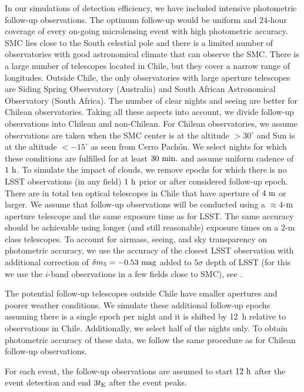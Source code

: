 \documentclass[12pt,letterpaper]{article}
\begin{document}
In our simulations of detection efficiency, 
we have included intensive photometric follow-up observations.  
The optimum follow-up would be uniform and 24-hour coverage of 
every on-going microlensing event with high photometric accuracy. 
SMC lies close to the South celestial pole and there is a limited number of 
observatories with good astronomical climate that can observe the SMC.  
There is a large number of telescopes located in Chile, but they cover a narrow 
range of longitudes.  Outside Chile, the only observatories with large aperture telescopes are 
Siding Spring Observatory (Australia) and 
South African Astronomical Observatory (South Africa).  
The number of clear nights and seeing are better for Chilean observatories.  
Taking all these aspects into account, we divide follow-up observations 
into Chilean and non-Chilean.  
For Chilean observatories, we assume observations are taken when the SMC center 
is at the altitude $>30^{\circ}$ and Sun is at the altitude $<-15^{\circ}$ 
as seen from Cerro Pach\'{o}n.  We select nights for which these conditions 
are fulfilled for at least $30~{\rm min.}$ and assume uniform cadence of 
$1~{\rm h}$.  To simulate the impact of clouds, we remove epochs for which 
there is no LSST observations (in any field) $1~{\rm h}$ prior or after 
considered follow-up epoch.  There are in total ten optical telescopes 
in Chile that have aperture of $4~{\rm m}$ or larger.  
We assume that follow-up observations will be conducted 
using a $\approx4$-${\rm m}$ aperture telescope and the same exposure time as for LSST.  
The same accuracy should be achievable using longer (and still reasonable) 
exposure times on a 2-m class telescopes.  To account for airmass, seeing, and 
sky transparency on photometric accuracy, we use the accuracy of the closest 
LSST observation with additional correction of $\delta m_5 = -0.53~{\rm mag}$ 
added to $5\sigma$ depth of LSST (for this we use the $i$-band observations 
in a few fields close to SMC), see \citet{ivezic18}. 

The potential follow-up telescopes outside Chile have smaller apertures and 
poorer weather conditions.  We simulate these additional follow-up epochs 
assuming there is a single epoch per night and it is shifted by 12~h 
relative to observations in Chile.  Additionally, we select half of 
the nights only.  To obtain photometric accuracy of these data, we follow 
the same procedure as for Chilean follow-up observations.

For each event, the follow-up observations are assumed to start $12~{\rm h}$ 
after the event detection and end $3t_{\rm E}$ after the event peaks.
\end{document}
